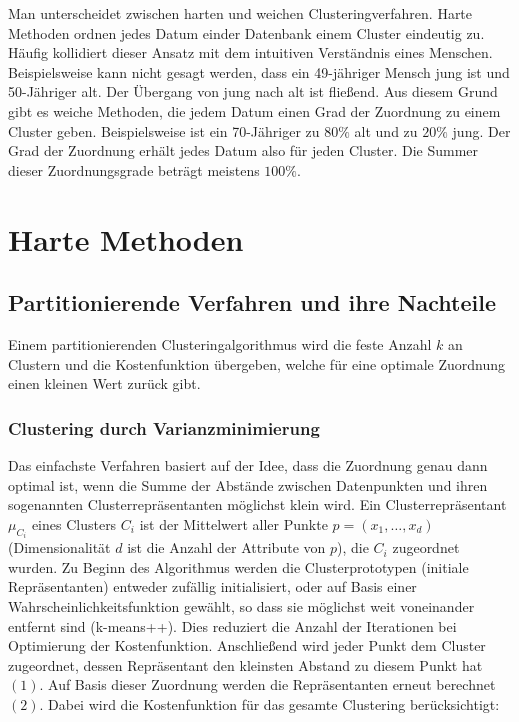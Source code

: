 \documentclass[11pt,fleqn]{book}
\begin{document}
Man unterscheidet zwischen harten und weichen Clusteringverfahren. Harte Methoden ordnen jedes Datum einder Datenbank einem Cluster eindeutig zu. Häufig kollidiert dieser Ansatz mit dem intuitiven Verständnis eines Menschen. Beispielsweise kann nicht gesagt werden, dass ein 49-jähriger Mensch jung ist und 50-Jähriger alt. Der Übergang von jung nach alt ist fließend. Aus diesem Grund gibt es weiche Methoden, die jedem Datum einen Grad der Zuordnung zu einem Cluster geben. Beispielsweise ist ein 70-Jähriger zu $80\%$ alt und zu $20\%$ jung. Der Grad der Zuordnung erhält jedes Datum also für jeden Cluster. Die Summer dieser Zuordnungsgrade beträgt meistens $100\%$.

\section{Harte Methoden}

\subsection{Partitionierende Verfahren und ihre Nachteile}
Einem partitionierenden Clusteringalgorithmus wird die feste Anzahl $k$ an Clustern und die Kostenfunktion übergeben, welche für eine optimale Zuordnung einen kleinen Wert zurück gibt.
\subsubsection{Clustering durch Varianzminimierung}
Das einfachste Verfahren basiert auf der Idee, dass die Zuordnung genau dann optimal ist, wenn die Summe der Abstände zwischen Datenpunkten und ihren sogenannten Clusterrepräsentanten möglichst klein wird. Ein Clusterrepräsentant $\mu_{C_i}$ eines Clusters $C_i$ ist der Mittelwert aller Punkte $p = (x_1,\dots,x_d)$ (Dimensionalität $d$ ist die Anzahl der Attribute von $p$), die $C_i$ zugeordnet wurden. Zu Beginn des Algorithmus werden die Clusterprototypen (initiale Repräsentanten) entweder zufällig initialisiert, oder auf Basis einer Wahrscheinlichkeitsfunktion gewählt, so dass sie möglichst weit voneinander entfernt sind (k-means++\cite{kmplus}). Dies reduziert die Anzahl der Iterationen bei Optimierung der Kostenfunktion. Anschließend wird jeder Punkt dem Cluster zugeordnet, dessen Repräsentant den kleinsten Abstand zu diesem Punkt hat $(1)$. Auf Basis dieser Zuordnung werden die Repräsentanten erneut berechnet $(2)$. Dabei wird die Kostenfunktion für das gesamte Clustering berücksichtigt:
\end{document}
